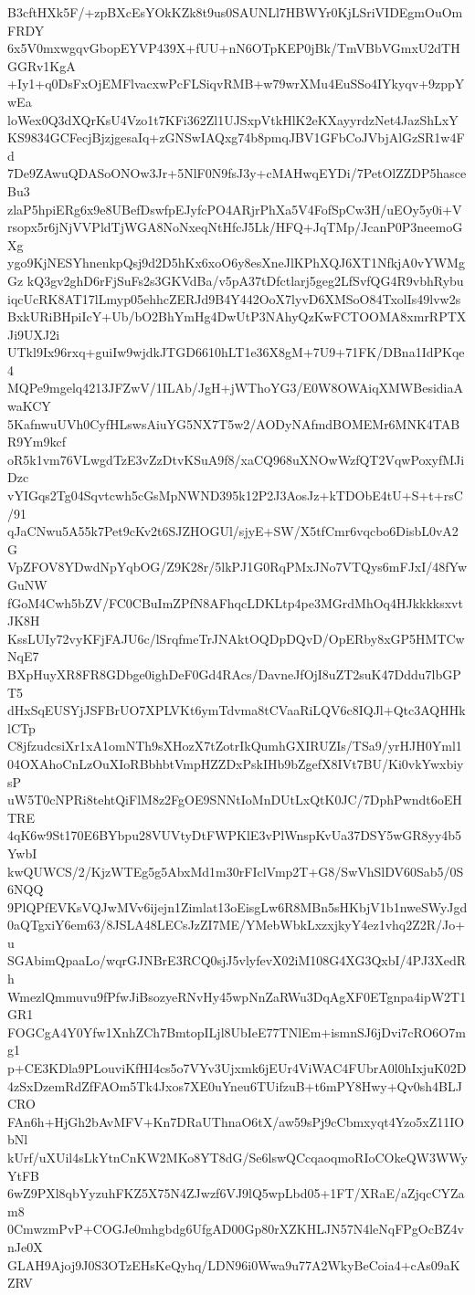 B3cftHXk5F/+zpBXcEsYOkKZk8t9us0SAUNLl7HBWYr0KjLSriVIDEgmOuOmFRDY
6x5V0mxwgqvGbopEYVP439X+fUU+nN6OTpKEP0jBk/TmVBbVGmxU2dTHGGRv1KgA
+Iy1+q0DsFxOjEMFlvacxwPcFLSiqvRMB+w79wrXMu4EuSSo4IYkyqv+9zppYwEa
loWex0Q3dXQrKsU4Vzo1t7KFi362Zl1UJSxpVtkHlK2eKXayyrdzNet4JazShLxY
KS9834GCFecjBjzjgesaIq+zGNSwIAQxg74b8pmqJBV1GFbCoJVbjAlGzSR1w4Fd
7De9ZAwuQDASoONOw3Jr+5NlF0N9fsJ3y+cMAHwqEYDi/7PetOlZZDP5hasceBu3
zlaP5hpiERg6x9e8UBefDswfpEJyfcPO4ARjrPhXa5V4FofSpCw3H/uEOy5y0i+V
rsopx5r6jNjVVPldTjWGA8NoNxeqNtHfcJ5Lk/HFQ+JqTMp/JcanP0P3neemoGXg
ygo9KjNESYhnenkpQsj9d2D5hKx6xoO6y8esXneJlKPhXQJ6XT1NfkjA0vYWMgGz
kQ3gv2ghD6rFjSuFs2s3GKVdBa/v5pA37tDfctlarj5geg2LfSvfQG4R9vbhRybu
iqcUcRK8AT17lLmyp05ehhcZERJd9B4Y442OoX7lyvD6XMSoO84TxolIs49lvw2s
BxkURiBHpiIcY+Ub/bO2BhYmHg4DwUtP3NAhyQzKwFCTOOMA8xmrRPTXJi9UXJ2i
UTkl9Ix96rxq+guiIw9wjdkJTGD6610hLT1e36X8gM+7U9+71FK/DBna1IdPKqe4
MQPe9mgelq4213JFZwV/1ILAb/JgH+jWThoYG3/E0W8OWAiqXMWBesidiaAwaKCY
5KafnwuUVh0CyfHLswsAiuYG5NX7T5w2/AODyNAfmdBOMEMr6MNK4TABR9Ym9kcf
oR5k1vm76VLwgdTzE3vZzDtvKSuA9f8/xaCQ968uXNOwWzfQT2VqwPoxyfMJiDzc
vYIGqs2Tg04Sqvtcwh5cGsMpNWND395k12P2J3AosJz+kTDObE4tU+S+t+rsC/91
qJaCNwu5A55k7Pet9cKv2t6SJZHOGUl/sjyE+SW/X5tfCmr6vqcbo6DisbL0vA2G
VpZFOV8YDwdNpYqbOG/Z9K28r/5lkPJ1G0RqPMxJNo7VTQys6mFJxI/48fYwGuNW
fGoM4Cwh5bZV/FC0CBuImZPfN8AFhqcLDKLtp4pe3MGrdMhOq4HJkkkksxvtJK8H
KssLUIy72vyKFjFAJU6c/lSrqfmeTrJNAktOQDpDQvD/OpERby8xGP5HMTCwNqE7
BXpHuyXR8FR8GDbge0ighDeF0Gd4RAcs/DavneJfOjI8uZT2suK47Dddu7lbGPT5
dHxSqEUSYjJSFBrUO7XPLVKt6ymTdvma8tCVaaRiLQV6c8IQJl+Qtc3AQHHklCTp
C8jfzudcsiXr1xA1omNTh9sXHozX7tZotrIkQumhGXIRUZIs/TSa9/yrHJH0Yml1
04OXAhoCnLzOuXIoRBbhbtVmpHZZDxPskIHb9bZgefX8IVt7BU/Ki0vkYwxbiysP
uW5T0cNPRi8tehtQiFlM8z2FgOE9SNNtIoMnDUtLxQtK0JC/7DphPwndt6oEHTRE
4qK6w9St170E6BYbpu28VUVtyDtFWPKlE3vPlWnspKvUa37DSY5wGR8yy4b5YwbI
kwQUWCS/2/KjzWTEg5g5AbxMd1m30rFIclVmp2T+G8/SwVhSlDV60Sab5/0S6NQQ
9PlQPfEVKsVQJwMVv6ijejn1Zimlat13oEisgLw6R8MBn5sHKbjV1b1nweSWyJgd
0aQTgxiY6em63/8JSLA48LECsJzZI7ME/YMebWbkLxzxjkyY4ez1vhq2Z2R/Jo+u
SGAbimQpaaLo/wqrGJNBrE3RCQ0sjJ5vlyfevX02iM108G4XG3QxbI/4PJ3XedRh
WmezlQmmuvu9fPfwJiBsozyeRNvHy45wpNnZaRWu3DqAgXF0ETgnpa4ipW2T1GR1
FOGCgA4Y0Yfw1XnhZCh7BmtopILjl8UbIeE77TNlEm+ismnSJ6jDvi7cRO6O7mg1
p+CE3KDla9PLouviKfHI4cs5o7VYv3Ujxmk6jEUr4ViWAC4FUbrA0l0hIxjuK02D
4zSxDzemRdZfFAOm5Tk4Jxos7XE0uYneu6TUifzuB+t6mPY8Hwy+Qv0sh4BLJCRO
FAn6h+HjGh2bAvMFV+Kn7DRaUThnaO6tX/aw59sPj9cCbmxyqt4Yzo5xZ11IObNl
kUrf/uXUil4sLkYtnCnKW2MKo8YT8dG/Se6lswQCcqaoqmoRIoCOkeQW3WWyYtFB
6wZ9PXl8qbYyzuhFKZ5X75N4ZJwzf6VJ9lQ5wpLbd05+1FT/XRaE/aZjqcCYZam8
0CmwzmPvP+COGJe0mhgbdg6UfgAD00Gp80rXZKHLJN57N4leNqFPgOcBZ4vnJe0X
GLAH9Ajoj9J0S3OTzEHsKeQyhq/LDN96i0Wwa9u77A2WkyBeCoia4+cAs09aKZRV

